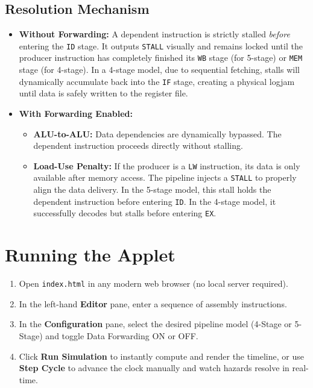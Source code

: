 \documentclass[12pt,a4paper]{article}
\begin{document}
\subsection{Resolution Mechanism}
\begin{itemize}
    \item \textbf{Without Forwarding:} A dependent instruction is strictly stalled \textit{before} entering the \texttt{ID} stage. It outputs \texttt{STALL} visually and remains locked until the producer instruction has completely finished its \texttt{WB} stage (for 5-stage) or \texttt{MEM} stage (for 4-stage). In a 4-stage model, due to sequential fetching, stalls will dynamically accumulate back into the \texttt{IF} stage, creating a physical logjam until data is safely written to the register file.
    \item \textbf{With Forwarding Enabled:} 
    \begin{itemize}
        \item \textbf{ALU-to-ALU:} Data dependencies are dynamically bypassed. The dependent instruction proceeds directly without stalling.
        \item \textbf{Load-Use Penalty:} If the producer is a \texttt{LW} instruction, its data is only available after memory access. The pipeline injects a \texttt{STALL} to properly align the data delivery. In the 5-stage model, this stall holds the dependent instruction before entering \texttt{ID}. In the 4-stage model, it successfully decodes but stalls before entering \texttt{EX}.
    \end{itemize}
\end{itemize}

\section{Running the Applet}
\begin{enumerate}
    \item Open \texttt{index.html} in any modern web browser (no local server required).
    \item In the left-hand \textbf{Editor} pane, enter a sequence of assembly instructions.
    \item In the \textbf{Configuration} pane, select the desired pipeline model (4-Stage or 5-Stage) and toggle Data Forwarding ON or OFF.
    \item Click \textbf{Run Simulation} to instantly compute and render the timeline, or use \textbf{Step Cycle} to advance the clock manually and watch hazards resolve in real-time.
\end{enumerate}
\end{document}
